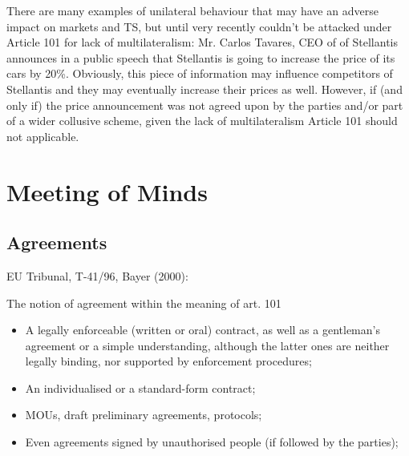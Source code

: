         There are many examples of unilateral behaviour that may have an adverse impact on markets and TS, but until very recently couldn't be attacked under Article 101 for lack of multilateralism: Mr. Carlos Tavares, CEO of of Stellantis announces in a public speech that Stellantis is going to increase the price of its cars by 20\%. Obviously, this piece of information may influence competitors of Stellantis and they may eventually increase their prices as well. However, if (and only if) the price announcement was not agreed upon by the parties and/or part of a wider collusive scheme, given the lack of multilateralism Article 101 should not applicable.

    \section{Meeting of Minds}


\newpage

        \subsection{Agreements}

            EU Tribunal, T-41/96, Bayer (2000):


            The notion of agreement within the meaning of art. 101

            \begin{itemize}
                \item A legally enforceable (written or oral) contract, as well as a gentleman’s agreement or a simple understanding, although the latter ones are neither legally binding, nor supported by enforcement procedures;
                \item An individualised or a standard-form contract;
                \item MOUs, draft preliminary agreements, protocols;
                \item Even agreements signed by unauthorised people (if followed by the parties);
            \end{itemize}


